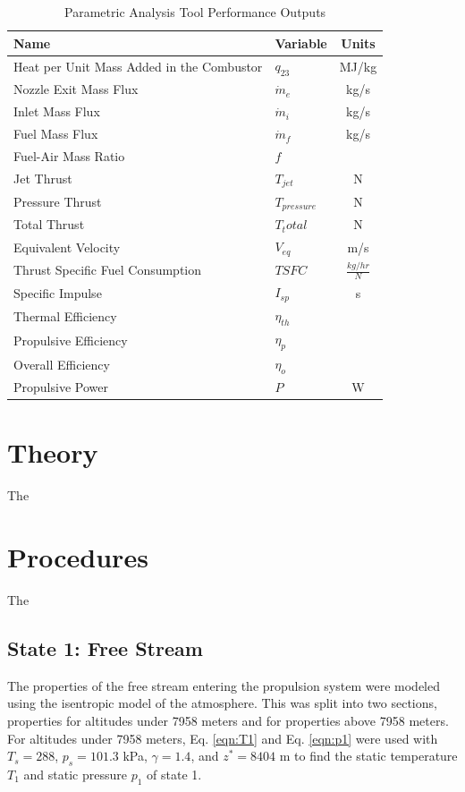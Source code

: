 \documentclass[conf]{new-aiaa} %
\begin{document}
\begin{table}[hbt!] %
    \caption{\label{tab:perf_outputs} Parametric Analysis Tool Performance Outputs}
    \centering
    \begin{tabular}{llc}
        \hline
        Name& Variable& Units\\\hline
        Heat per Unit Mass Added in the Combustor& $q_{23}$& MJ/kg\\
        Nozzle Exit Mass Flux& $\dot m_e$& kg/s\\
        Inlet Mass Flux& $\dot m_i$& kg/s\\
        Fuel Mass Flux& $\dot m_f$& kg/s\\
        Fuel-Air Mass Ratio& $f$\\
        Jet Thrust& $T_{jet}$& N\\
        Pressure Thrust& $T_{pressure}$& N\\
        Total Thrust& $T_total$& N\\
        Equivalent Velocity& $V_{eq}$& m/s\\
        Thrust Specific Fuel Consumption& $TSFC$& $\frac{kg/hr}{N}$\\
        Specific Impulse& $I_{sp}$& s\\
        Thermal Efficiency& $\eta_{th}$\\
        Propulsive Efficiency& $\eta_p$\\
        Overall Efficiency& $\eta_o$\\
        Propulsive Power& $P$& W\\
        \hline
    \end{tabular}
\end{table}


\section{Theory}
The

\section{Procedures}
The

\subsection{State 1: Free Stream}
The properties of the free stream entering the propulsion system were modeled using the isentropic model of the atmosphere. This was split into two sections, properties for altitudes under 7958 meters and for properties above 7958 meters. For altitudes under 7958 meters, Eq. \ref{eqn:T1} and Eq. \ref{eqn:p1} were used with $T_s=288$, $p_s=101.3$ kPa, $\gamma=1.4$, and $z^*=8404$ m to find the static temperature $T_1$ and static pressure $p_1$ of state 1.
\end{document}
